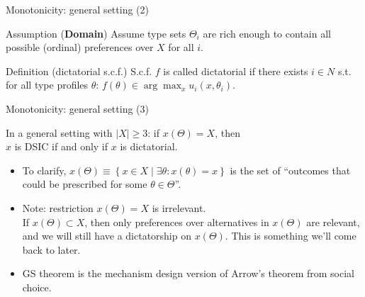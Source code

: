 \documentclass[english,10pt
,aspectratio=169
]{beamer}
\begin{document}
\begin{frame}{Monotonicity: general setting (2)}
	\begin{exampleblock}{Assumption (\textbf{Domain})}
		Assume type sets $\Theta_i$ are rich enough to contain all possible (ordinal) preferences over $X$ for all $i$.
	\end{exampleblock}
	\begin{exampleblock}{Definition (dictatorial s.c.f.)}
		S.c.f. $f$ is called \alert{dictatorial} if there exists $i \in N$ s.t. for all type profiles $\theta$:
	$ f(\theta) \in \arg \max_x u_i(x,\theta_i).$
	\end{exampleblock}
\end{frame}


\begin{frame}{Monotonicity: general setting (3)}
	\begin{theorem}
		In a general setting with $|X|\geq 3$: if $x(\Theta)=X$, then\\
		\centering
		$x$ is \alert{DSIC} if and only if $x$ is \alert{dictatorial}.
	\end{theorem}
	\begin{itemize}
		\item To clarify, $x(\Theta) \equiv \left\{ x \in X \mid \exists \theta: x(\theta) = x \right\}$ is the set of ``outcomes that could be prescribed for some $\theta \in \Theta$''.
		\item Note: restriction $x(\Theta) = X$ is irrelevant.\\
		If $x(\Theta) \subset X$, then only preferences over alternatives in $x(\Theta)$ are relevant, and we will still have a dictatorship on $x(\Theta)$. This is something we'll come back to later.
		\item GS theorem is the mechanism design version of Arrow's theorem from social choice.
	\end{itemize}
\end{frame}
\end{document}
